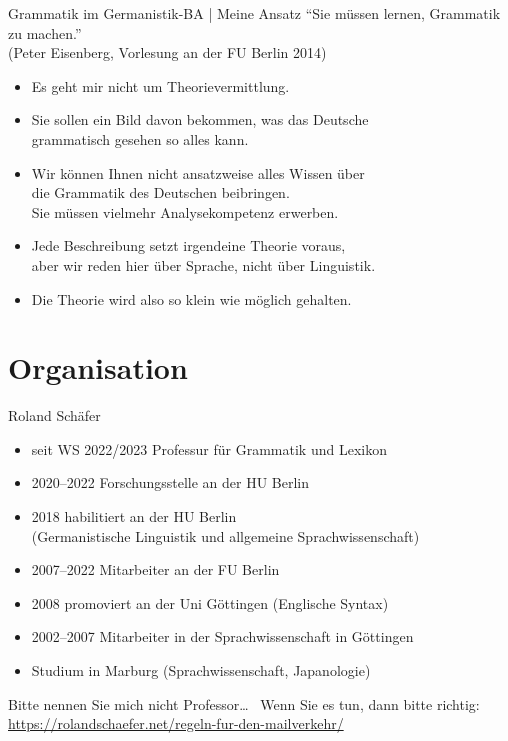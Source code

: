 
\begin{frame}
  {Grammatik im Germanistik-BA | Meine Ansatz}
  \onslide<+->
  \onslide<+->
  \alert{\Large "`Sie müssen lernen, Grammatik zu machen."'}\\
  (Peter Eisenberg, Vorlesung an der FU Berlin 2014)\\
  \Zeile
  \onslide<+->
  \begin{itemize}[<+->]
    \item Es geht mir nicht um Theorievermittlung.
    \item Sie sollen ein Bild davon bekommen, was das Deutsche\\
      grammatisch gesehen so alles kann.
    \item Wir können Ihnen nicht ansatzweise alles Wissen über\\
      die Grammatik des Deutschen beibringen.\\
      Sie müssen vielmehr \alert{Analysekompetenz} erwerben.
    \item Jede Beschreibung setzt irgendeine Theorie voraus,\\
      aber \alert{wir reden hier über Sprache, nicht über Linguistik}.
    \item Die Theorie wird also so klein wie möglich gehalten.
  \end{itemize}
\end{frame}

\section{Organisation}

\begin{frame}
  {Roland Schäfer}
  \onslide<+->
  \begin{itemize}[<+->]
    \item seit WS 2022\slash 2023 Professur für Grammatik und Lexikon
    \item 2020--2022 Forschungsstelle an der HU Berlin
    \item 2018 habilitiert an der HU Berlin\\
      (Germanistische Linguistik und allgemeine Sprachwissenschaft)
    \item 2007--2022 Mitarbeiter an der FU Berlin
    \item 2008 promoviert an der Uni Göttingen (Englische Syntax)
    \item 2002--2007 Mitarbeiter in der Sprachwissenschaft in Göttingen
    \item Studium in Marburg (Sprachwissenschaft, Japanologie)
  \end{itemize}
  \Zeile
  \onslide<+->
  Bitte nennen Sie mich nicht Professor\ldots\ \onslide<+-> Wenn Sie es tun, dann bitte richtig:\\
  \url{https://rolandschaefer.net/regeln-fur-den-mailverkehr/}
\end{frame}

